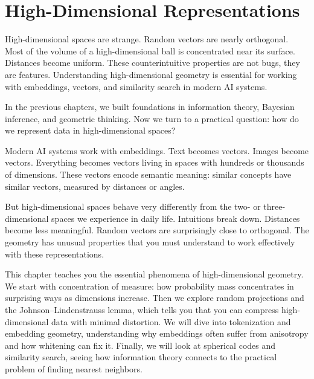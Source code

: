 
\chapter{High-Dimensional Representations}

\begin{keyinsight}
High-dimensional spaces are strange. Random vectors are nearly orthogonal. Most of the volume of a high-dimensional ball is concentrated near its surface. Distances become uniform. These counterintuitive properties are not bugs, they are features. Understanding high-dimensional geometry is essential for working with embeddings, vectors, and similarity search in modern AI systems.
\end{keyinsight}

\vspace{1.5em}

In the previous chapters, we built foundations in information theory, Bayesian inference, and geometric thinking. Now we turn to a practical question: how do we represent data in high-dimensional spaces?

Modern AI systems work with embeddings. Text becomes vectors. Images become vectors. Everything becomes vectors living in spaces with hundreds or thousands of dimensions. These vectors encode semantic meaning: similar concepts have similar vectors, measured by distances or angles.

But high-dimensional spaces behave very differently from the two- or three-dimensional spaces we experience in daily life. Intuitions break down. Distances become less meaningful. Random vectors are surprisingly close to orthogonal. The geometry has unusual properties that you must understand to work effectively with these representations.

This chapter teaches you the essential phenomena of high-dimensional geometry. We start with concentration of measure: how probability mass concentrates in surprising ways as dimensions increase. Then we explore random projections and the Johnson--Lindenstrauss lemma, which tells you that you can compress high-dimensional data with minimal distortion. We will dive into tokenization and embedding geometry, understanding why embeddings often suffer from anisotropy and how whitening can fix it. Finally, we will look at spherical codes and similarity search, seeing how information theory connects to the practical problem of finding nearest neighbors.

